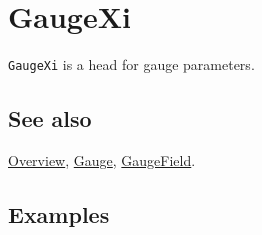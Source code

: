 \documentclass[../FeynCalcManual.tex]{subfiles}
\begin{document}
\hypertarget{gaugexi}{%
\section{GaugeXi}\label{gaugexi}}

\texttt{GaugeXi} is a head for gauge parameters.

\subsection{See also}

\hyperlink{toc}{Overview}, \hyperlink{gauge}{Gauge},
\hyperlink{gaugefield}{GaugeField}.

\subsection{Examples}
\end{document}

